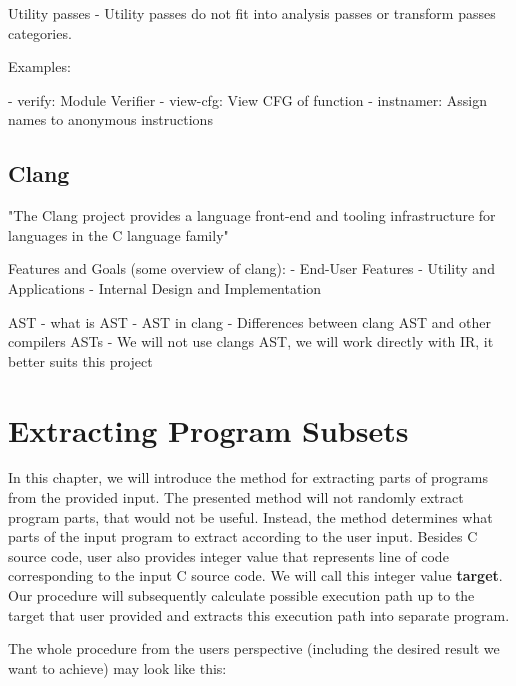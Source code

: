 \documentclass[12pt, twoside]{fithesis2}
\renewcommand{\_}{\leavevmode \kern0.07em\vbox{\hrule width0.4em}}
\begin{document}
Utility passes
- Utility passes do not fit into analysis passes or transform passes categories.

Examples:

- verify: Module Verifier
- view-cfg: View CFG of function
- instnamer: Assign names to anonymous instructions

\section{Clang}
\label{sec:llvm-clang}

"The Clang project provides a language front-end and tooling infrastructure for
languages in the C language family"

Features and Goals (some overview of clang):
- End-User Features
- Utility and Applications
- Internal Design and Implementation

AST
- what is AST
- AST in clang
- Differences between clang AST and other compilers ASTs
- We will not use clangs AST, we will work directly with IR, it better suits
this project


\chapter{Extracting Program Subsets}
\label{chap:design}


In this chapter, we will introduce the method for extracting parts of programs
from the provided input. The presented method will not randomly extract program
parts, that would not be useful. Instead, the method determines what parts of
the input program to extract according to the user input. Besides C source code,
user also provides integer value that represents line of code corresponding to
the input C source code. We will call this integer value \textbf{target}.
Our procedure will subsequently calculate possible execution path up to the
target that user provided and extracts this execution path into separate
program.

The whole procedure from the users perspective (including the desired result we
want to achieve) may look like this:
\end{document}
